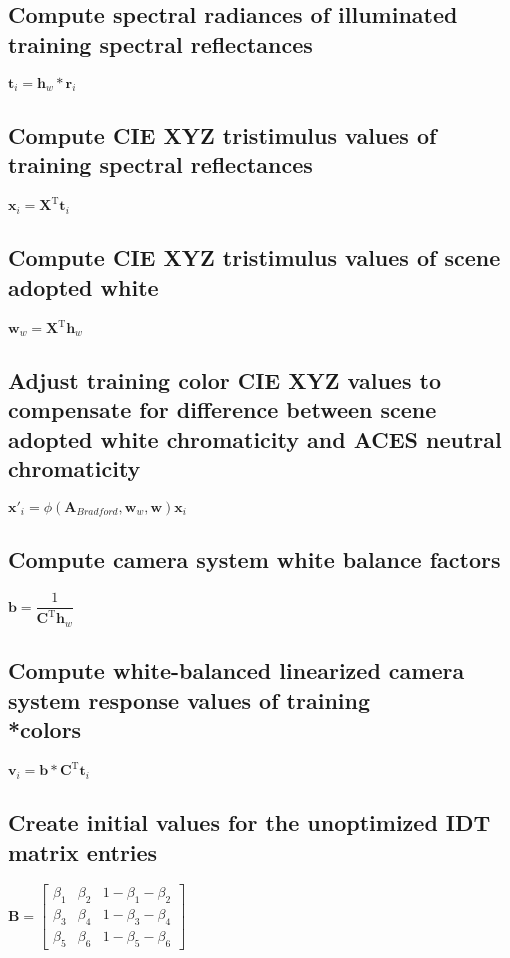 \subsection{Compute spectral radiances of illuminated training spectral reflectances}
$\mathbf{t}_i=\mathbf{h}_w*\mathbf{r}_i$

\subsection{Compute CIE XYZ tristimulus values of training spectral reflectances}
$\mathbf{x}_i=\mathbf{X}^\mathrm{T}\mathbf{t}_i$

\subsection{Compute CIE XYZ tristimulus values of scene adopted white}
$\mathbf{w}_w=\mathbf{X}^\mathrm{T}\mathbf{h}_w$

\subsection{Adjust training color CIE XYZ values to compensate for difference between scene adopted white chromaticity and ACES neutral chromaticity}
$\mathbf{x}'_i = \phi(\mathbf{A}_{Bradford},\mathbf{w}_w,\mathbf{w})\mathbf{x}_i$

\subsection{Compute camera system white balance factors}
$\mathbf{b}=\dfrac{1}{\mathbf{C}^\mathrm{T}\mathbf{h}_w}$

\subsection{Compute white-balanced linearized camera system response values of training \\*colors}
$\mathbf{v}_i=\mathbf{b}*\mathbf{C}^\mathrm{T}\mathbf{t}_i$

\subsection{Create initial values for the unoptimized IDT matrix entries}
$   \mathbf{B} =
    \begin{bmatrix}
		\beta_1 & \beta_2 & 1-\beta_1-\beta_2 \\
		\beta_3 & \beta_4 & 1-\beta_3-\beta_4 \\
		\beta_5 & \beta_6 & 1-\beta_5-\beta_6
    \end{bmatrix}$

